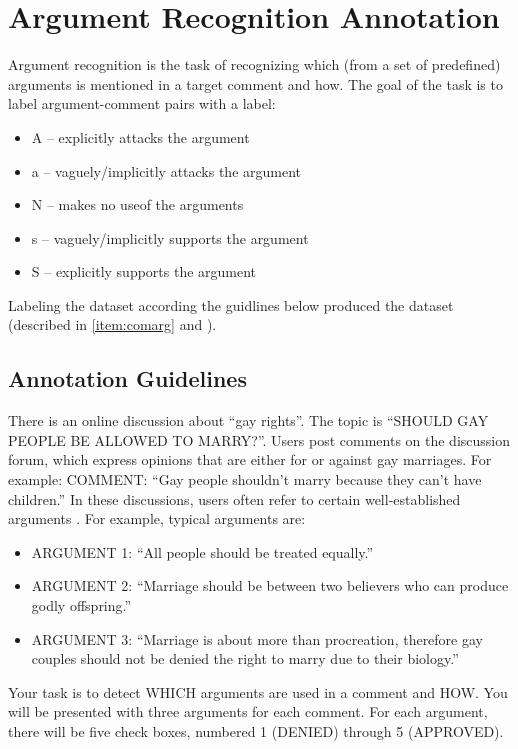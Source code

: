 \section{Argument Recognition Annotation}
\label{sec:argrec_annotation}

Argument recognition is the task of recognizing which (from a set of predefined)
arguments is mentioned in a target comment and how. The goal of the task is 
to label argument-comment pairs with a label:
\begin{itemize}
\item A -- explicitly attacks the argument
\item a -- vaguely/implicitly attacks the argument
\item N -- makes no useof the arguments
\item s -- vaguely/implicitly supports the argument
\item S -- explicitly supports the argument
\end{itemize}
Labeling the dataset according the guidlines below
produced the \ComArg dataset (described in \ref{item:comarg} and \citep{boltuzic2014back}).

\subsection{Annotation Guidelines}

There is an online discussion about ``gay rights''. The topic is ``SHOULD GAY
PEOPLE BE ALLOWED TO MARRY?''. Users post comments on the discussion forum,
which express opinions that are either for or against gay marriages. For
example: COMMENT: ``Gay people shouldn’t marry because they can’t have
children.''
In these discussions, users often refer to certain well-established arguments .
For example, typical arguments are:
\begin{itemize}
\item ARGUMENT 1: ``All people should be treated equally.''
\item ARGUMENT 2: ``Marriage should be between two believers who can produce godly offspring.''
\item ARGUMENT 3: ``Marriage is about more than procreation, therefore gay couples should not be denied the right to marry due to their biology.''
\end{itemize}

\noindent Your task is to detect WHICH arguments are used in a comment and HOW. You will
be presented with three arguments for each comment. For each argument, there
will be five check boxes, numbered 1 (DENIED) through 5 (APPROVED). 

